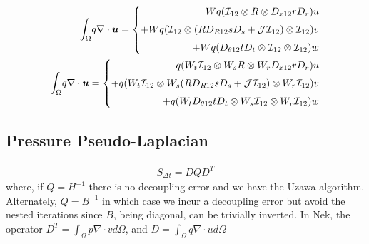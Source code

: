 \documentclass{kthreport}
\begin{document}
\begin{eqnarray}
	\mathlarger\int_{\Omega} q\nabla\cdot \bm{u}  = \left\{
		\begin{split}
			Wq(\mathcal{I}_{12}\otimes R\otimes D_{x12}rD_{r})u \\
			+ Wq(\mathcal{I}_{12}\otimes (RD_{R12}sD_{s} + \mathcal{J}\mathcal{I}_{12})\otimes \mathcal{I}_{12})v \\
			+ Wq(D_{\theta12}tD_{t}\otimes \mathcal{I}_{12}\otimes \mathcal{I}_{12})w
		\end{split}\right. \\
	\mathlarger\int_{\Omega} q\nabla\cdot \bm{u}  = \left\{
\begin{split}
	q(W_{t}\mathcal{I}_{12}\otimes W_{s}R\otimes W_{r}D_{x12}rD_{r})u \\
	+ q(W_{t}\mathcal{I}_{12}\otimes W_{s}(RD_{R12}sD_{s} + \mathcal{J}\mathcal{I}_{12})\otimes W_{r}\mathcal{I}_{12})v \\
	+ q(W_{t}D_{\theta12}tD_{t}\otimes W_{s}\mathcal{I}_{12}\otimes W_{r}\mathcal{I}_{12})w
\end{split}\right.	
\end{eqnarray}

\subsection{Pressure Pseudo-Laplacian}

\begin{eqnarray}
	S_{\Delta t} = D QD^{T} \label{eqn:pressure_pseudo_laplacian}
\end{eqnarray}
where, if $Q=H^{-1}$ there is no decoupling error and we have the Uzawa algorithm. Alternately, $Q=B^{-1}$ in which case we incur a decoupling error but avoid the nested iterations since $B$, being diagonal, can be trivially inverted. In Nek, the operator $D^{T} = \int_{\Omega}p\nabla\cdot v d\Omega$, and $D = \int_{\Omega}q\nabla\cdot u d\Omega$





\FloatBarrier



\end{document}
